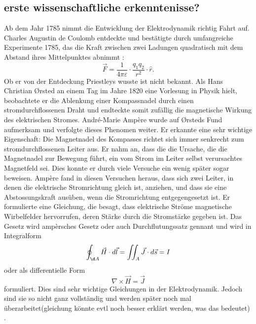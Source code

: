 \subsection{erste wissenschaftliche erkenntenisse?}
Ab dem Jahr 1785 nimmt die Entwicklung der Elektrodynamik richtig Fahrt auf.
Charles Augustin de Coulomb entdeckte und bestätigte durch umfangreiche Experimente 1785, das die Kraft zwischen zwei Ladungen quadratisch mit dem Abstand ihres Mittelpunktes abnimmt \cite{maxwell:Charles-Augustin_de_Coulomb}:
\[
\vec{F}
=
\frac{1}{4 \pi \varepsilon}
\cdot
\frac{q_1 q_2}{r^2}
\cdot
\hat{r}.
\]
Ob er von der Entdeckung Priestleys wusste ist nicht bekannt.
Als Hans Christian Ørsted an einem Tag im Jahre 1820 eine Vorlesung in Physik hielt, beobachtete er die Ablenkung einer Kompassnadel durch einen stromdurchflossenen Draht und endteckte somit zufällig die magnetische Wirkung des elektrischen Stromes.
André-Marie Ampère wurde auf Ørsteds Fund aufmerksam und verfolgte dieses Phenomen weiter.
Er erkannte eine sehr wichtige Eigenschaft: Die Magnetnadel des Kompasses richtet sich immer senkrecht zum stromdurchflossenen Leiter aus.
Er nahm an, dass die die Ursache, die die Magnetnadel zur Bewegung führt, ein vom Strom im Leiter selbst verursachtes Magnetfeld sei.
Dies konnte er durch viele Versuche ein wenig später sogar beweisen.
Ampère fand in diesen Versuchen heraus, dass sich zwei Leiter, in denen die elektrische Stromrichtung gleich ist, anziehen, und dass sie eine Abstossungskraft ausüben, wenn die Stromrichtung entgegengesetzt ist.
Er formulierte eine Gleichung, die besagt, dass elektrische Ströme magnetische Wirbelfelder hervorrufen, deren Stärke durch die Stromstärke gegeben ist.
Das Gesetz wird ampèrsches Gesetz oder auch Durchflutungssatz gennant und wird in Integralform
\[
\oint_{\d A}
\vec{H}
\cdot
d\vec{l}
=
\iint_{A}
\vec{J}
\cdot
d\vec{s}
=
I
\]
oder als differentielle Form
\[
\nabla
\times
\vec{H}
=
\vec{J}
\]
formuliert.
Dies sind sehr wichtige Gleichungen in der Elektrodynamik.
Jedoch sind sie so nicht ganz vollständig und werden später noch mal überarbeitet(gleichung könnte evtl noch besser erklärt werden, was das bedeutet) \cite{maxwell:Hans_Christian_Ørsted}\cite{maxwell:André-Marie_Ampère}.

